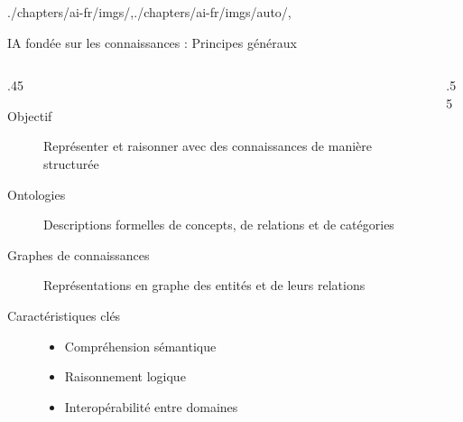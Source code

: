\begin{graphicspathcontext}{{./chapters/ai-fr/imgs/},{./chapters/ai-fr/imgs/auto/},\old}

\begin{frame}[t,fragile]{{IA fondée sur les connaissances :} Principes généraux}
	\begin{columns}
		\begin{column}{.45\linewidth}
			\begin{block}{}
				\begin{description}
					\item[Objectif] Représenter et raisonner avec des connaissances de manière structurée
					\item[Ontologies] Descriptions formelles de concepts, de relations et de catégories
					\item[Graphes de connaissances] Représentations en graphe des entités et de leurs relations
					\item[Caractéristiques clés]
						\begin{itemize}
						\item Compréhension sémantique
						\item Raisonnement logique
						\item Interopérabilité entre domaines
						\end{itemize}
				\end{description}
			\end{block}
		\end{column}
		\begin{column}{.55\linewidth}
		\end{column}
	\end{columns}
\end{frame}

\end{graphicspathcontext}

\endinput

